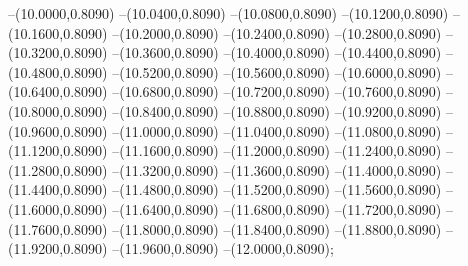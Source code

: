 {	--(10.0000,0.8090)
	--(10.0400,0.8090)
	--(10.0800,0.8090)
	--(10.1200,0.8090)
	--(10.1600,0.8090)
	--(10.2000,0.8090)
	--(10.2400,0.8090)
	--(10.2800,0.8090)
	--(10.3200,0.8090)
	--(10.3600,0.8090)
	--(10.4000,0.8090)
	--(10.4400,0.8090)
	--(10.4800,0.8090)
	--(10.5200,0.8090)
	--(10.5600,0.8090)
	--(10.6000,0.8090)
	--(10.6400,0.8090)
	--(10.6800,0.8090)
	--(10.7200,0.8090)
	--(10.7600,0.8090)
	--(10.8000,0.8090)
	--(10.8400,0.8090)
	--(10.8800,0.8090)
	--(10.9200,0.8090)
	--(10.9600,0.8090)
	--(11.0000,0.8090)
	--(11.0400,0.8090)
	--(11.0800,0.8090)
	--(11.1200,0.8090)
	--(11.1600,0.8090)
	--(11.2000,0.8090)
	--(11.2400,0.8090)
	--(11.2800,0.8090)
	--(11.3200,0.8090)
	--(11.3600,0.8090)
	--(11.4000,0.8090)
	--(11.4400,0.8090)
	--(11.4800,0.8090)
	--(11.5200,0.8090)
	--(11.5600,0.8090)
	--(11.6000,0.8090)
	--(11.6400,0.8090)
	--(11.6800,0.8090)
	--(11.7200,0.8090)
	--(11.7600,0.8090)
	--(11.8000,0.8090)
	--(11.8400,0.8090)
	--(11.8800,0.8090)
	--(11.9200,0.8090)
	--(11.9600,0.8090)
	--(12.0000,0.8090);
}

